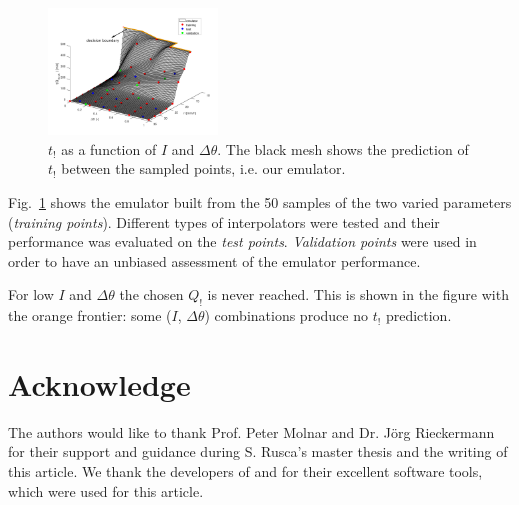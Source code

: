 \documentclass[12pt,a4paper,english,twocolumn,fleqn]{narms}
\begin{document}
\begin{figure}[htpb]
  \centering
  \includegraphics[width=0.4\textwidth]{img/emulator.png}
  \caption{$t_!$ as a function of $I$ and $\Delta\theta$.
  The black mesh shows the prediction of $t_!$ between the sampled points, i.e. our emulator.}
  \label{img:emulator}
\end{figure}

Fig.~\ref{img:emulator} shows the emulator built from the 50 samples of the two varied parameters (\textit{training points}).
Different types of interpolators were tested and their performance was evaluated on the \textit{test points}.
\textit{Validation points} were used in order to have an unbiased assessment of the emulator performance.

For low $I$ and $\Delta\theta$ the chosen $Q_!$ is never reached. This is shown in the figure with the orange frontier: some ($I$, $\Delta\theta$) combinations produce no $t_!$ prediction.




\section{Acknowledge}
The authors would like to thank Prof. Peter Molnar and Dr. Jörg Rieckermann for their support and guidance during S. Rusca's master thesis and the writing of this article.
We thank the developers of  and  for their excellent software tools, which were used for this article.
\end{document}
